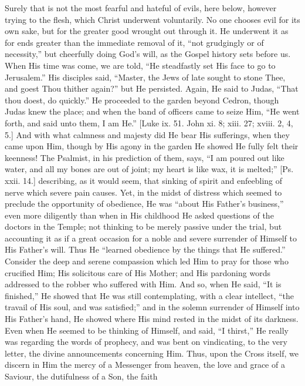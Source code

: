 Surely that is not the most fearful and hateful of evils, here
below, however trying to the flesh, which Christ underwent
voluntarily. No one chooses evil for its own sake, but for the greater
good wrought out through it. He underwent it as for ends greater than
the immediate removal of it, ``not grudgingly or of
necessity,'' but cheerfully doing God's will, as the Gospel
history sets before us. When His time was come, we are told, ``He
steadfastly set His face to go to Jerusalem.'' His disciples said,
``Master, the Jews of late sought to stone Thee, and goest Thou
thither again?'' but He persisted. Again, He said to Judas,
``That thou doest, do quickly.'' He proceeded to the garden
beyond Cedron, though Judas knew the place; and when the band of
officers came to seize Him, ``He went forth, and said unto them, I
am He.'' [Luke ix. 51. John xi. 8; xiii. 27; xviii. 2, 4, 5.] And
with what calmness and majesty did He bear His sufferings, when they
came upon Him, though by His agony in the garden He showed He fully
felt their keenness! The Psalmist, in his prediction of them, says,
``I am poured out like water, and all my bones are out of joint;
my heart is like wax, it is melted;'' [Ps. xxii. 14.] describing,
as it would seem, that sinking of spirit and enfeebling of nerve which
severe pain causes. Yet, in the midst of distress which seemed to
preclude the opportunity of obedience, He was ``about His Father's
business,'' even more diligently than when in His childhood He
asked questions of the doctors in the Temple; not thinking to be
merely passive under the trial, but accounting it as if a great
occasion for a noble and severe surrender of Himself to His Father's
will. Thus He ``learned obedience by the things that He
suffered.'' Consider the deep and serene compassion which led Him
to pray for those who crucified Him; His solicitous care of His
Mother; and His pardoning words addressed to the robber who suffered
with Him. And so, when He said, ``It is finished,'' He showed
that He was still contemplating, with a clear intellect, ``the
travail of His soul, and was satisfied;'' and in the solemn
surrender of Himself into His Father's hand, He showed where His mind
rested in the midst of its darkness. Even when He seemed to be
thinking of Himself, and said, ``I thirst,'' He really was
regarding the words of prophecy, and was bent on vindicating, to the
very letter, the divine announcements concerning Him. Thus, upon the
Cross itself, we discern in Him the mercy of a Messenger from heaven,
the love and grace of a Saviour, the dutifulness of a Son, the faith
